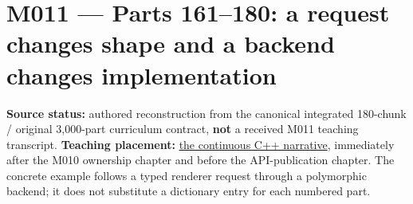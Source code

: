 \section{M011 --- Parts 161--180: a request changes shape and a backend changes implementation}\label{appendix-fd090d982a15-m011-parts-161180-a-request-changes-shape-and-a-backend-changes-implementation}

\textbf{Source status:} authored reconstruction from the canonical integrated 180-chunk / original 3,000-part curriculum contract, \textbf{not} a received M011 teaching transcript. \textbf{Teaching placement:} \href{Continuous\%20Notes/Computing\%20Foundations\%20-\%20From\%20Bits\%20to\%20C++\%20and\%20Systems\%20APIs\#From\%20one\%20owned\%20resource\%20to\%20many\%20requests\%20and\%20a\%20replaceable\%20backend}{the continuous C++ narrative}, immediately after the M010 ownership chapter and before the API-publication chapter. The concrete example follows a typed renderer request through a polymorphic backend; it does not substitute a dictionary entry for each numbered part.

